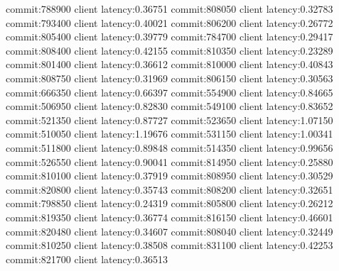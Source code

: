 commit:788900 client latency:0.36751
commit:808050 client latency:0.32783
commit:793400 client latency:0.40021
commit:806200 client latency:0.26772
commit:805400 client latency:0.39779
commit:784700 client latency:0.29417
commit:808400 client latency:0.42155
commit:810350 client latency:0.23289
commit:801400 client latency:0.36612
commit:810000 client latency:0.40843
commit:808750 client latency:0.31969
commit:806150 client latency:0.30563
commit:666350 client latency:0.66397
commit:554900 client latency:0.84665
commit:506950 client latency:0.82830
commit:549100 client latency:0.83652
commit:521350 client latency:0.87727
commit:523650 client latency:1.07150
commit:510050 client latency:1.19676
commit:531150 client latency:1.00341
commit:511800 client latency:0.89848
commit:514350 client latency:0.99656
commit:526550 client latency:0.90041
commit:814950 client latency:0.25880
commit:810100 client latency:0.37919
commit:808950 client latency:0.30529
commit:820800 client latency:0.35743
commit:808200 client latency:0.32651
commit:798850 client latency:0.24319
commit:805800 client latency:0.26212
commit:819350 client latency:0.36774
commit:816150 client latency:0.46601
commit:820480 client latency:0.34607
commit:808040 client latency:0.32449
commit:810250 client latency:0.38508
commit:831100 client latency:0.42253
commit:821700 client latency:0.36513